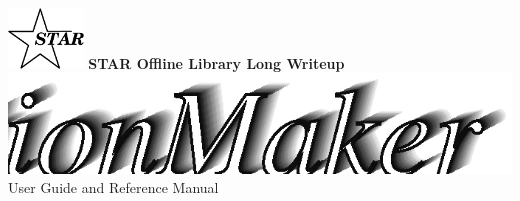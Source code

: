 %
%
\newcommand{\entrylabel}[1]{\mbox{\textbf{{#1}}}\hfil}%
\newenvironment{entry}
{\begin{list}{}%
    {\renewcommand{\makelabel}{\entrylabel}%
     \setlength{\labelwidth}{90pt}%
     \setlength{\leftmargin}{\labelwidth}
     \advance\leftmargin by \labelsep%
    }%
}%
{\end{list}}

\newcommand{\Entrylabel}[1]%
{\raisebox{0pt}[1ex][0pt]{\makebox[\labelwidth][l]%
    {\parbox[t]{\labelwidth}{\hspace{0pt}\textbf{{#1}}}}}}
\newenvironment{Entry}%
{\renewcommand{\entrylabel}{\Entrylabel}\begin{entry}}%
  {\end{entry}}



%
%
\begin{titlepage}
\pagestyle{empty}
\vspace*{-35mm}
\begin{center}
  \mbox{\includegraphics[width=2cm]{StarIcon.eps}}
  {\Large\bf STAR Offline Library Long Writeup}
  \hfill\mbox{}\\[3cm]
  \mbox{\includegraphics[width=\textwidth]{StAssociationMakerTitle.eps}}
  \hfill\mbox{}\\[3cm]
  {\LARGE User Guide and Reference Manual}\\[2cm]
  {\LARGE $  $}  \\[5mm] %
  {\LARGE $  $}  %
  \vfill
\end{center}
\cleardoublepage
\end{titlepage}


